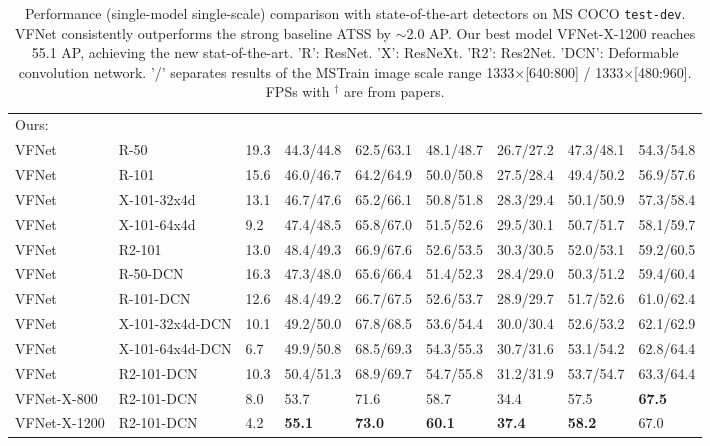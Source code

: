 \begin{table*}[tpb]
\begin{center}
\begin{tabular}{ K{11.0em} | K{8.0em} |K{2.5em} | K{4.2em} K{4.2em} K{4.2em} | K{4.2em} K{4.2em} K{4.2em} }
            \hline
             Ours: &  &    &  &  &  &  &\\
             VFNet & R-50 & 19.3 & 44.3/44.8 & 62.5/63.1 & 48.1/48.7 & 26.7/27.2 & 47.3/48.1 & 54.3/54.8 \\
             VFNet & R-101 & 15.6 & 46.0/46.7 & 64.2/64.9 & 50.0/50.8 & 27.5/28.4 & 49.4/50.2 & 56.9/57.6 \\
             VFNet & X-101-32x4d & 13.1 & 46.7/47.6 & 65.2/66.1 & 50.8/51.8 & 28.3/29.4 & 50.1/50.9 & 57.3/58.4 \\
             VFNet & X-101-64x4d & 9.2 & 47.4/48.5 & 65.8/67.0 & 51.5/52.6 & 29.5/30.1 & 50.7/51.7 & 58.1/59.7 \\
             VFNet & R2-101~\cite{Res2Net} & 13.0 & 48.4/49.3 & 66.9/67.6 & 52.6/53.5 & 30.3/30.5 & 52.0/53.1 & 59.2/60.5 \\
             VFNet & R-50-DCN & 16.3 & 47.3/48.0 & 65.6/66.4 & 51.4/52.3 & 28.4/29.0 & 50.3/51.2 & 59.4/60.4 \\
             VFNet & R-101-DCN & 12.6 & 48.4/49.2 & 66.7/67.5 & 52.6/53.7 & 28.9/29.7 & 51.7/52.6 & 61.0/62.4 \\
             VFNet & X-101-32x4d-DCN & 10.1 & 49.2/50.0 & 67.8/68.5 & 53.6/54.4 & 30.0/30.4 & 52.6/53.2 & 62.1/62.9 \\
             VFNet & X-101-64x4d-DCN & 6.7 & 49.9/50.8 & 68.5/69.3 & 54.3/55.3 & 30.7/31.6 & 53.1/54.2 & 62.8/64.4 \\
             VFNet & R2-101-DCN~\cite{Res2Net} & 10.3 & 50.4/51.3 & 68.9/69.7 & 54.7/55.8 & 31.2/31.9 & 53.7/54.7 & 63.3/64.4 \\
             
             VFNet-X-800 & R2-101-DCN~\cite{Res2Net} & 8.0 & 53.7 & 71.6 & 58.7 & 34.4 & 57.5 & \textbf{67.5} \\
             VFNet-X-1200 & R2-101-DCN~\cite{Res2Net} & 4.2 & \textbf{55.1} & \textbf{73.0} & \textbf{60.1} & \textbf{37.4} & \textbf{58.2} & 67.0 \\
            
            \hline
        \end{tabular}
    \end{center}
    \vspace{-5mm}
\caption{Performance (single-model single-scale) comparison with state-of-the-art detectors on MS COCO \texttt{test-dev}. VFNet consistently outperforms the strong baseline ATSS by $\sim$2.0 AP. Our best model VFNet-X-1200 reaches 55.1 AP, achieving the new stat-of-the-art. 'R': ResNet. 'X': ResNeXt. 'R2': Res2Net. 'DCN': Deformable convolution network. '/' separates results of the MSTrain image scale range 1333$\times$[640:800] / 1333$\times$[480:960]. FPSs with $^{\dag}$ are from papers.}
\label{table:sota}
\end{table*}
